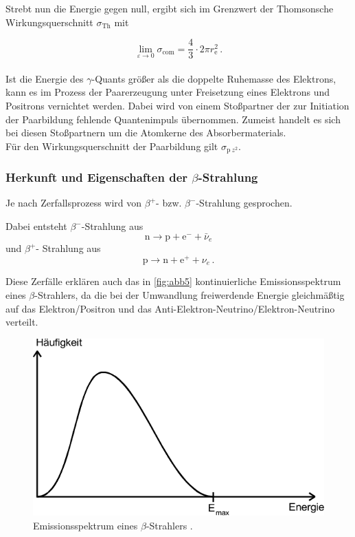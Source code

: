 Strebt nun die Energie gegen null, ergibt sich im Grenzwert
der Thomsonsche Wirkungsquerschnitt $\sigma_{\text{Th}}$ mit

\begin{equation*}
    \lim_{\varepsilon \rightarrow 0} \sigma_{\text{com}} =
    \frac{4}{3} \cdot 2 \pi r_{\text{e}}^2 \,.
\end{equation*} \\

Ist die Energie des $\gamma$-Quants größer als die 
doppelte Ruhemasse des Elektrons, kann es im Prozess
der Paarerzeugung unter Freisetzung eines Elektrons und
Positrons vernichtet werden.
Dabei wird von einem Stoßpartner der zur Initiation der Paarbildung
fehlende Quantenimpuls übernommen.
Zumeist handelt es sich bei diesen Stoßpartnern um die 
Atomkerne des Absorbermaterials. \\

Für den Wirkungsquerschnitt der Paarbildung gilt $\sigma_{\text{p} ~ z^2}$.


\subsubsection*{Herkunft und Eigenschaften der $\beta$-Strahlung}

Je nach Zerfallsprozess wird von $\beta^+$- bzw. 
$\beta^-$-Strahlung gesprochen.

Dabei entsteht $\beta^-$-Strahlung aus
\begin{equation*}
    \text{n} \rightarrow \text{p} + \text{e}^- + \bar{\nu}_e
\end{equation*}
und $\beta^+$- Strahlung aus
\begin{equation*}
    \text{p} \rightarrow \text{n} + \text{e}^+ + \nu_e \,.
\end{equation*}

Diese Zerfälle erklären auch das in \autoref{fig:abb5} kontinuierliche Emissionsspektrum
eines $\beta$-Strahlers, da die bei der Umwandlung freiwerdende Energie
gleichmäßtig auf das Elektron/Positron und das Anti-Elektron-Neutrino/Elektron-Neutrino
verteilt.

\begin{figure}[H]
    \centering
    \includegraphics{figures/abb5.pdf}
    \caption{Emissionsspektrum eines $\beta$-Strahlers \cite{ap04}.}
    \label{fig:abb5}
\end{figure}


